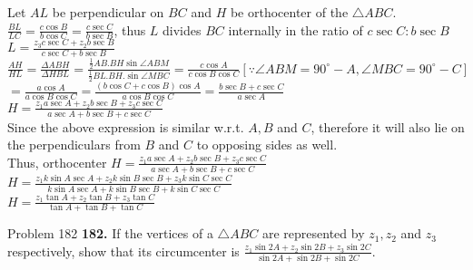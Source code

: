 \documentclass[aspectratio=169,8pt]{beamer}
\begin{document}
\begin{frame}
  Let $AL$ be perpendicular on $BC$ and $H$ be orthocenter of the $\triangle ABC$.\\
  \vspace*{0.2cm}
  $\frac{BL}{LC} = \frac{c\cos B}{b\cos C} = \frac{c\sec C}{b\sec B}$, thus $L$ divides $BC$ internally in the ratio of $c\sec
  C:b\sec B$\\
  $L = \frac{z_3c\sec C + z_2b\sec B}{c\sec C + b\sec B}$\\
  \vspace*{0.2cm}
  $\frac{AH}{HL} = \frac{\Delta ABH}{\Delta HBL} = \frac{\frac{1}{2}AB.BH\sin\angle ABM}{\frac{1}{2}BL.BH.\sin\angle MBC} = \frac{c\cos A}{c\cos B\cos C}[\because \angle ABM = 90^\circ - A, \angle MBC = 90^\circ - C]$\\
  $= \frac{a\cos A}{a\cos B\cos C} = \frac{(b\cos C + c\cos B)\cos A}{a\cos B\cos C} = \frac{b\sec B + c\sec C}{a\sec A}$\\
  \vspace*{0.2cm}
  $H = \frac{z_1a\sec A + z_2b\sec B + z_3c\sec C}{a\sec A + b\sec B + c\sec C}$\\
  \vspace*{0.2cm}
  Since the above expression is similar w.r.t. $A, B$ and $C$, therefore it will also lie on the perpendiculars from $B$ and $C$ to
  opposing sides as well.\\
  \vspace*{0.2cm}
  Thus, orthocenter $H = \frac{z_1a\sec A + z_2b\sec B + z_3c\sec C}{a\sec A + b\sec B + c\sec C}$\\
  \vspace*{0.2cm}
  $H = \frac{z_1k\sin A\sec A + z_2k\sin B\sec B + z_3k\sin C\sec C}{k\sin A\sec A + k\sin B\sec B + k\sin C\sec C}$\\
  \vspace*{0.2cm}
  $H = \frac{z_1\tan A + z_2\tan B + z_3\tan C}{\tan A + \tan B + \tan C}$
\end{frame}
\begin{frame}{Problem 182}
  \textbf{182.} If the vertices of a $\triangle ABC$ are represented by $z_1, z_2$ and $z_3$ respectively, show that its
  circumcenter is $\frac{z_1\sin 2A + z_2\sin 2B + z_3\sin 2C}{\sin 2A + \sin 2B + \sin 2C}$.
\end{frame}
\end{document}
